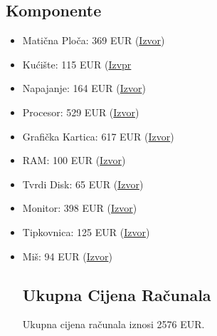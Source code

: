 \documentclass{article}
\begin{document}
\subsection*{Komponente}
\begin{itemize}
\item Matična Ploča: 369 EUR (\href{https://www.nabava.net/maticne-ploce/asus-rog-strix-z590-e-gaming-wifi-mainboard-cijena-503379551/}{Izvor})
\item Kućište: 115 EUR (\href{https://www.mikronis.hr/Proizvod/kuciste-nzxt-h510-crno-crveno-bez-napajanja-p-n-ca-h510b-br/11256?utm_source=nabava.net&utm_campaign=nabava.net&utm_medium=click}{Izvpr}
\item Napajanje: 164 EUR (\href{https://www.gamershop.hr/pc/corsair-rm850x-napajanje-850-w-24-pin-atx-atx-crna?utm_source=nabava.net&utm_campaign=nabava.net&utm_medium=click/}{Izvor})
\item Procesor: 529 EUR (\href{https://www.instar-informatika.hr/procesor-intel-core-i9-12900k-52ghz-30mb-lga1700-bx8071512900k/110276/product/}{Izvor})
\item Grafička Kartica: 617 EUR (\href{https://www.amazon.com/MSI-3080-GPU-RTX-10G-LHR/dp/B09P6SZT74}{Izvor})
\item RAM: 100 EUR (\href{https://www.instar-informatika.hr/memorija-corsair-vengeance-lpx-32gb-2x16gb-ddr4-3200mhz-cl16/105658/product/}{Izvor})
\item Tvrdi Disk: 65 EUR (\href{https://www.hgspot.hr/tvrdi-disk-2-tb-seagate-barracuda-3-5-sata-iii-7200-rpm-256-mb-st2000dm008}{Izvor})
\item Monitor: 398 EUR (\href{https://www.mikronis.hr/Proizvod/monitor-dell-u2719d-27-led-ips-2560x1440-10001-350cd-m2-8ms-p-n-u2719d/1937}{Izvor})
\item Tipkovnica: 125 EUR (\href{https://laptopi.hr/informatika/periferija/tipkovnice/tipkovnica-logitech-mx-keys-advanced-wireless-crna-qwerty-spanjolska-siva-grafit-qwerty-detail?utm_source=nabava.net&utm_campaign=nabava.net&utm_medium=click}{Izvor})
\item Miš: 94 EUR (\href{https://iponcomp.hr/shop/proizvod/logitech-mx-master-3-crno/1812744?utm_source=nabava.net&utm_campaign=nabava.net&utm_medium=click}{Izvor})

\subsection*{Ukupna Cijena Računala}
Ukupna cijena računala iznosi 2576 EUR.


\end{itemize}
\end{document}
